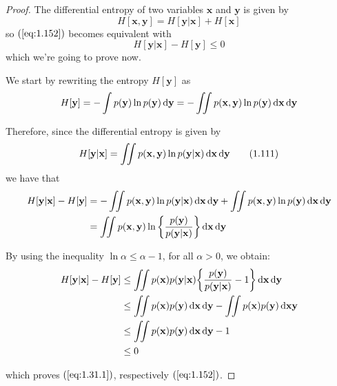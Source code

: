 \vspace{1em}

\begin{proof}
    The differential entropy of two variables $\mathbf{x}$ and  $\mathbf{y}$
    is given by 
    \begin{equation*}
        H[\mathbf{x}, \mathbf{y}] = H[\mathbf{y} | \mathbf{x}] + H[\mathbf{x}]
        \tag{1.112}\label{eq:1.112}
    \end{equation*}
    so $(\ref{eq:1.152})$ becomes equivalent with
    \begin{equation*}
        H[\mathbf{y} | \mathbf{x}] - H[\mathbf{y}] \leq 0
        \tag{1.31.1}\label{eq:1.31.1}
    \end{equation*}
    which we're going to prove now. 

    We start by rewriting the entropy $H[\mathbf{y}]$ as
    \[
        H[\mathbf{y}] 
        = -\int p(\mathbf{y}) \ln p(\mathbf{y}) \mathop{}\!\mathrm{d} \mathbf{y}
        = -\iint p(\mathbf{x}, \mathbf{y}) \ln p(\mathbf{y}) \mathop{}\!\mathrm{d} \mathbf{x} \mathop{}\!\mathrm{d} \mathbf{y}
    \] 

    Therefore, since the differential entropy is given by
    \begin{equation*}
        H[\mathbf{y} | \mathbf{x}] 
        = \iint p(\mathbf{x}, \mathbf{y}) \ln p(\mathbf{y} | \mathbf{x}) \mathop{}\!\mathrm{d} \mathbf{x} \mathop{}\!\mathrm{d} \mathbf{y}
        \tag{1.111}\label{eq:1.111}
    \end{equation*}
    we have that
    \begin{align*}
         H[\mathbf{y} | \mathbf{x}] - H[\mathbf{y}] 
        &= -\iint p(\mathbf{x}, \mathbf{y}) \ln p(\mathbf{y} | \mathbf{x}) \mathop{}\!\mathrm{d} \mathbf{x} \mathop{}\!\mathrm{d} \mathbf{y}
        + \iint p(\mathbf{x}, \mathbf{y}) \ln p(\mathbf{y}) \mathop{}\!\mathrm{d} \mathbf{x} \mathop{}\!\mathrm{d} \mathbf{y} \\
        &= \iint p(\mathbf{x}, \mathbf{y}) \ln \bigg\{ \frac{p(\mathbf{y})}{p(\mathbf{y}|\mathbf{x})}\bigg\}
        \mathop{}\!\mathrm{d} \mathbf{x} \mathop{}\!\mathrm{d} \mathbf{y}
    \end{align*}

    By using the inequality $\ln \alpha \leq \alpha - 1$, for all $\alpha > 0$, we obtain:
    \begin{align*}
         H[\mathbf{y} | \mathbf{x}] - H[\mathbf{y}] 
        &\leq \iint p(\mathbf{x}) p(\mathbf{y} | \mathbf{x}) \bigg\{\frac{p(\mathbf{y})}{p(\mathbf{y} | \mathbf{x})} - 1\bigg\}
        \mathop{}\!\mathrm{d} \mathbf{x} \mathop{}\!\mathrm{d} \mathbf{y} \\
        &\leq \iint p(\mathbf{x}) p(\mathbf{y}) \mathop{}\!\mathrm{d} \mathbf{x} \mathop{}\!\mathrm{d} \mathbf{y} 
        - \iint p(\mathbf{x}) p(\mathbf{y}) \mathop{}\!\mathrm{d} \mathbf{x} \mathbf{y} \\
        &\leq \iint p(\mathbf{x}) p(\mathbf{y}) \mathop{}\!\mathrm{d} \mathbf{x} \mathop{}\!\mathrm{d} \mathbf{y}  - 1 \\
        &\leq 0
    \end{align*}

    which proves $(\ref{eq:1.31.1})$, respectively $(\ref{eq:1.152})$.
\end{proof}

